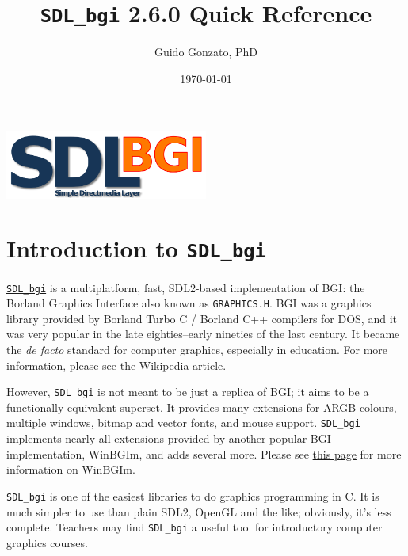 \documentclass[a4paper,12pt]{article}
\newcommand{\version}{2.6.0}        %
\newcommand{\T}[1]{\texttt{#1}}     %
\newcommand{\SDLbgi}{\texttt{SDL\_bgi}}
\begin{document}
\title{\SDLbgi{} \version{} Quick Reference}

\author{Guido Gonzato, PhD}

\date{\today}

\maketitle

\begin{center}
  \includegraphics[width=0.5\textwidth]{SDL_bgi_logo.png}
\end{center}

{\small \tableofcontents}


\section{Introduction to \SDLbgi}

\href{https://sdl_bgi.sourceforge.net}{\SDLbgi} is a multiplatform,
fast, SDL2-based implementation of BGI: the Borland Graphics Interface
also known as \T{GRAPHICS.H}. BGI was a graphics library provided by
Borland Turbo C / Borland C++ compilers for DOS, and it was very
popular in the late eighties--early nineties of the last century. It
became the \emph{de facto} standard for computer graphics, especially
in education. For more information, please see 
\href{https://en.wikipedia.org/wiki/Borland_Graphics_Interface}{the
Wikipedia article}.


However, \SDLbgi{} is not meant to be just a replica of BGI; it aims
to be a functionally equivalent superset. It provides many extensions
for ARGB colours, multiple windows, bitmap and vector fonts, and mouse
support. \SDLbgi{} implements nearly all extensions provided by
another popular BGI implementation, WinBGIm, and adds several more.
Please see \href{http://www.codecutter.net/tools/winbgim}{this page}
for more information on WinBGIm.

\SDLbgi{} is one of the easiest libraries to do graphics programming
in C. It is much simpler to use than plain SDL2, OpenGL and the like;
obviously, it's less complete. Teachers may find \SDLbgi{} a useful
tool for introductory computer graphics courses.
\end{document}
